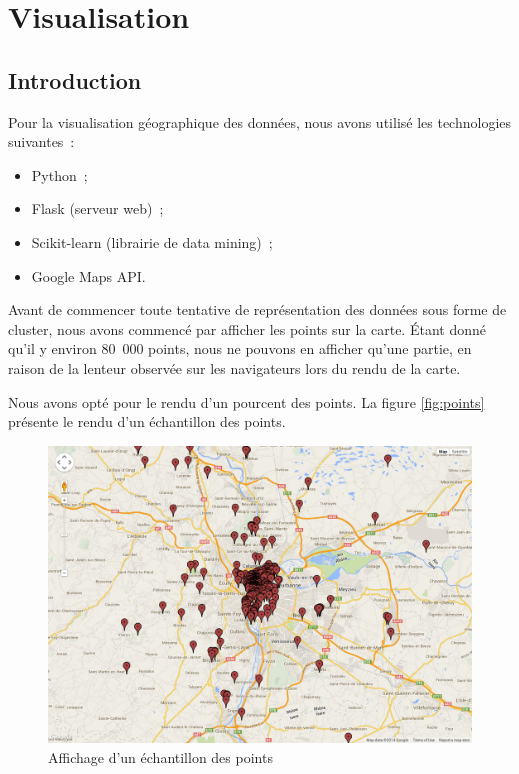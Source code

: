 \chapter{Visualisation}

\section{Introduction}
Pour la visualisation géographique des données, nous avons utilisé les technologies suivantes~:
\begin{itemize}
    \item Python~;
    \item Flask (serveur web)~;
    \item Scikit-learn (librairie de data mining)~;
    \item Google Maps API.\\
\end{itemize}

Avant de commencer toute tentative de représentation des données sous forme de cluster, nous avons commencé par afficher les points sur la carte.
Étant donné qu'il y environ 80~000 points, nous ne pouvons en afficher qu'une partie, en raison de la lenteur observée sur les navigateurs lors du rendu de la carte.

Nous avons opté pour le rendu d'un pourcent des points. La figure \vref{fig:points} présente le rendu d'un échantillon des points.

\begin{figure}[!h]
    \centering
    \includegraphics[width=14cm]{images/points.png}
    \caption{Affichage d'un échantillon des points}
    \label{fig:points}
\end{figure}

